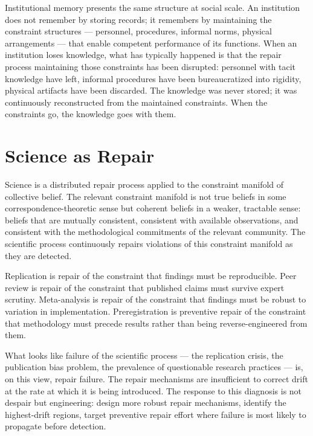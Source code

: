 \documentclass[11pt, a4paper]{article}
\theoremstyle{definition}
\theoremstyle{remark}
\begin{document}
Institutional memory presents the same structure at social scale. An institution
does not remember by storing records; it remembers by maintaining the constraint
structures --- personnel, procedures, informal norms, physical arrangements ---
that enable competent performance of its functions. When an institution loses
knowledge, what has typically happened is that the repair process maintaining
those constraints has been disrupted: personnel with tacit knowledge have left,
informal procedures have been bureaucratized into rigidity, physical artifacts
have been discarded. The knowledge was never stored; it was continuously
reconstructed from the maintained constraints. When the constraints go, the
knowledge goes with them.

\section{Science as Repair}

Science is a distributed repair process applied to the constraint manifold of
collective belief. The relevant constraint manifold is not true beliefs in some
correspondence-theoretic sense but coherent beliefs in a weaker, tractable
sense: beliefs that are mutually consistent, consistent with available
observations, and consistent with the methodological commitments of the
relevant community. The scientific process continuously repairs violations of
this constraint manifold as they are detected.

Replication is repair of the constraint that findings must be reproducible.
Peer review is repair of the constraint that published claims must survive
expert scrutiny. Meta-analysis is repair of the constraint that findings must
be robust to variation in implementation. Preregistration is preventive repair
of the constraint that methodology must precede results rather than being
reverse-engineered from them.

What looks like failure of the scientific process --- the replication crisis,
the publication bias problem, the prevalence of questionable research practices
--- is, on this view, repair failure. The repair mechanisms are insufficient
to correct drift at the rate at which it is being introduced. The response to
this diagnosis is not despair but engineering: design more robust repair
mechanisms, identify the highest-drift regions, target preventive repair effort
where failure is most likely to propagate before detection.
\end{document}
